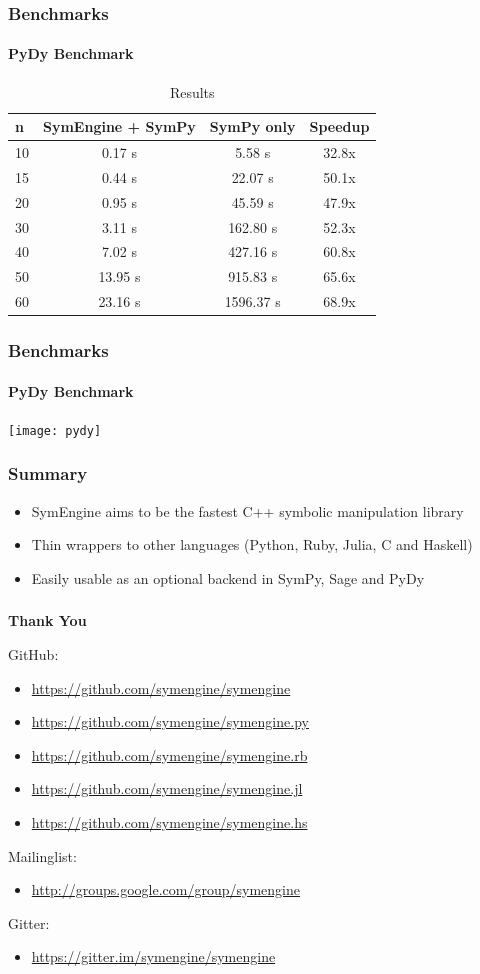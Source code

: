 \documentclass{beamer}
\begin{document}
\begin{frame}
\frametitle{Benchmarks}
\framesubtitle{PyDy Benchmark}
\begin{table}
\begin{tabular}{l | c | c | c  }
n & SymEngine + SymPy & SymPy only & Speedup\\
\hline \hline
10 & 0.17 s & 5.58 s & 32.8x \\
15 & 0.44 s & 22.07 s & 50.1x \\
20 & 0.95 s & 45.59 s & 47.9x \\
30 & 3.11 s & 162.80 s & 52.3x \\
40 & 7.02 s & 427.16 s & 60.8x \\
50 & 13.95 s & 915.83 s & 65.6x \\
60 & 23.16 s & 1596.37 s & 68.9x
\end{tabular}
\caption{Results}
\end{table}
\end{frame}


\begin{frame}
\frametitle{Benchmarks}
\framesubtitle{PyDy Benchmark}
\texttt{[image: pydy]}
\end{frame}


\begin{frame}
\frametitle{Summary}
\begin{itemize}
 \item SymEngine aims to be the fastest C++ symbolic manipulation library
 \item Thin wrappers to other languages (Python, Ruby, Julia, C and Haskell)
 \item Easily usable as an optional backend in SymPy, Sage and PyDy
\end{itemize}
\end{frame}


\begin{frame}
\frametitle{}
{\Large\bf Thank You}
\medskip

GitHub:
\begin{itemize}
\item \href{https://github.com/symengine/symengine}{https://github.com/symengine/symengine}
\item \href{https://github.com/symengine/symengine.py}{https://github.com/symengine/symengine.py}
\item \href{https://github.com/symengine/symengine.rb}{https://github.com/symengine/symengine.rb}
\item \href{https://github.com/symengine/symengine.jl}{https://github.com/symengine/symengine.jl}
\item \href{https://github.com/symengine/symengine.hs}{https://github.com/symengine/symengine.hs}
\end{itemize}
Mailinglist:
\begin{itemize}
\item \href{http://groups.google.com/group/symengine}{http://groups.google.com/group/symengine}
\end{itemize}
Gitter:
\begin{itemize}
\item \href{https://gitter.im/symengine/symengine}{https://gitter.im/symengine/symengine}
\end{itemize}
\end{frame}
\end{document}
